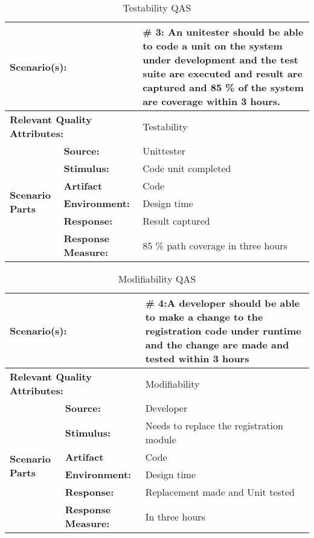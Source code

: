 \begin{table}[H]
\begin{center}
\begin{tabular}{|p{0.3cm}|p{2.5cm}|p{8cm}|}
  \hline
  \multicolumn{2}{|p{3cm}|}{\bfseries Scenario(s):} & \#  3: An unitester should be able to code a unit on the system under development and the test suite are executed and result are captured and 85 \% of the system are coverage within 3 hours. \\
  \hline
  \multicolumn{2}{|p{3cm}|}{\bfseries Relevant Quality Attributes:} & Testability\\
  \hline
  \multirow{6}{*}{\begin{sideways}{\bfseries Scenario Parts}\end{sideways}}
  & {\bfseries Source:} & Unittester \\
  \cline{2-3}
  & {\bfseries Stimulus:} & Code unit completed \\
  \cline{2-3}
  & {\bfseries Artifact} &  Code \\
  \cline{2-3}
  & {\bfseries Environment:} &  Design time \\
  \cline{2-3}
  & {\bfseries Response:} &  Result captured\\
  \cline{2-3}
  & {\bfseries Response Measure:} & 85 \% path coverage in three hours\\
  \hline
\end{tabular}
\caption{Testability QAS}
\end{center}
\end{table}




\begin{table}[H]
\begin{center}
\begin{tabular}{|p{0.3cm}|p{2.5cm}|p{8cm}|}
  \hline
  \multicolumn{2}{|p{3cm}|}{\bfseries Scenario(s):} & \#  4:A developer should be able to make a change to the registration code under runtime and the change are made and tested within 3 hours \\
  \hline
  \multicolumn{2}{|p{3cm}|}{\bfseries Relevant Quality Attributes:} & Modifiability\\
  \hline
  \multirow{6}{*}{\begin{sideways}{\bfseries Scenario Parts}\end{sideways}}
  & {\bfseries Source:} & Developer \\
  \cline{2-3}
  & {\bfseries Stimulus:} & Needs to replace the registration module \\
  \cline{2-3}
  & {\bfseries Artifact} &  Code \\
  \cline{2-3}
  & {\bfseries Environment:} &  Design time \\
  \cline{2-3}
  & {\bfseries Response:} &  Replacement made and Unit tested\\
  \cline{2-3}
  & {\bfseries Response Measure:} & In three hours\\
  \hline
\end{tabular}
\caption{Modifiability QAS}
\end{center}
\end{table}




